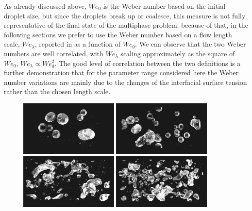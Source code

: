 As already discussed above, $We_0$ is the Weber number based on the initial droplet size, but since the droplets break up or coalesce, this measure is not fully representative of the final state of the multiphase problem; because of that, in the following sections we prefer to use the Weber number based on a flow length scale, $We_\lambda$, reported in  as a function of $We_0$. We can observe that the two Weber numbers are well correlated, with $We_\lambda$ scaling approximately as the square of $We_0$, \ie $We_\lambda \propto We_0^2$. The good level of correlation between the two definitions is a further demonstration that for the parameter range considered here the Weber number variations are mainly due to the changes of the interfacial surface tension rather than the chosen length scale.
\begin{figure}
	\centering
	\includegraphics[width=0.44\textwidth]{view1}
	\includegraphics[width=0.44\textwidth]{view2} \\ \vspace{0.1cm}
	\includegraphics[width=0.44\textwidth]{view3}
	\includegraphics[width=0.44\textwidth]{view4} \\ \vspace{0.1cm}

\end{figure}
